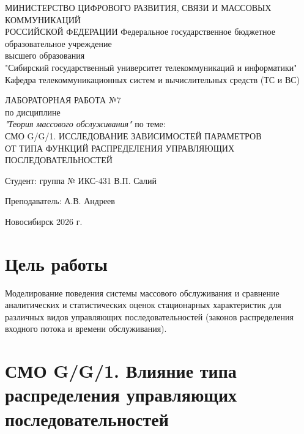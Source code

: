 \documentclass[a4paper,14pt,oneside,openany]{memoir}
\begin{document}
\thispagestyle{empty}
\begin{center}
    МИНИСТЕРСТВО ЦИФРОВОГО РАЗВИТИЯ, СВЯЗИ И МАССОВЫХ КОММУНИКАЦИЙ \\ РОССИЙСКОЙ ФЕДЕРАЦИИ
    \vspace{20pt}
    Федеральное государственное бюджетное образовательное учреждение \\ высшего образования \\
    "Сибирский государственный университет телекоммуникаций и информатики" \\
    \vspace{20pt}
    Кафедра телекоммуникационных систем и вычислительных средств (ТС и ВС)
\end{center}
\vfill
\begin{center}
    ЛАБОРАТОРНАЯ РАБОТА №7 \\
    по дисциплине \\
    \textit{"Теория массового обслуживания"}
    \vspace{20pt}
    по теме: \\
    \uppercase{СМО G/G/1. Исследование зависимостей параметров \\ от типа функций распределения управляющих последовательностей}
\end{center}
\vfill
\noindent Студент: группа № ИКС-431 \hfill В.П. Салий

\vspace{20pt}

\noindent Преподаватель: \hfill А.В. Андреев
\vfill
\begin{center}
    Новосибирск 2026 г.
\end{center}

\newpage
\setcounter{page}{2}
\OnehalfSpacing*

\chapter*{Цель работы}
Моделирование поведения системы массового обслуживания и сравнение аналитических и статистических оценок стационарных характеристик для различных видов управляющих последовательностей (законов распределения входного потока и времени обслуживания).

\chapter{СМО G/G/1. Влияние типа распределения управляющих последовательностей}
\label{ch:lab7}
\end{document}
